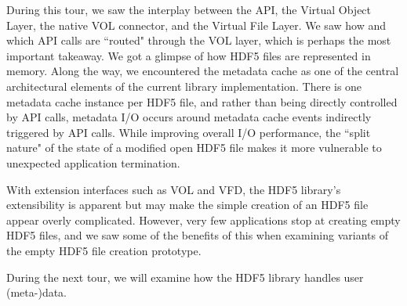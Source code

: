 During this tour, we saw the interplay between the API, the Virtual Object Layer, the native VOL connector, and the Virtual File Layer. We saw how and which API calls are ``routed" through the VOL layer, which is perhaps the most important takeaway. We got a glimpse of how HDF5 files are represented in memory. Along the way, we encountered the metadata cache as one of the central architectural elements of the current library implementation. There is one metadata cache instance per HDF5 file, and rather than being directly controlled by API calls, metadata I/O occurs around metadata cache events indirectly triggered by API calls. While improving overall I/O performance, the ``split nature" of the state of a modified open HDF5 file makes it more vulnerable to unexpected application termination.

With extension interfaces such as VOL and VFD, the HDF5 library's extensibility is apparent but may make the simple creation of an HDF5 file appear overly complicated. However, very few applications stop at creating empty HDF5 files, and we saw some of the benefits of this when examining variants of the empty HDF5 file creation prototype.

During the next tour, we will examine how the HDF5 library handles user (meta-)data.